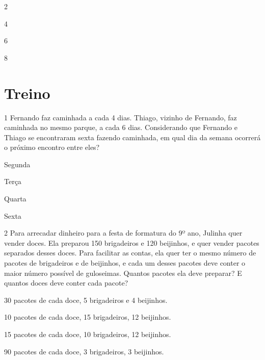 \begin{escolha}
\begin{minipage}{.5\textwidth}
\begin{escolha}
\item 2
\item 4
\item 6
\item 8
\end{escolha}
\end{minipage}

\section{Treino}

\num{1} Fernando faz caminhada a cada 4 dias. Thiago, vizinho de
Fernando, faz caminhada no mesmo parque, a cada 6 dias. Considerando que
Fernando e Thiago se encontraram sexta fazendo caminhada, em qual dia da
semana ocorrerá o próximo encontro entre eles?

\begin{escolha}
\item Segunda
\item Terça
\item Quarta
\item Sexta
\end{escolha}

\num{2} Para arrecadar dinheiro para a festa de formatura do 9º ano,
Julinha quer vender doces. Ela preparou 150 brigadeiros e 120 beijinhos,
e quer vender pacotes separados desses doces. Para facilitar as contas,
ela quer ter o mesmo número de pacotes de brigadeiros e de beijinhos, e
cada um desses pacotes deve conter o maior número possível de guloseimas. 
Quantos pacotes ela deve preparar? E quantos doces deve conter cada 
pacote?   

\begin{escolha}
\item
  30 pacotes de cada doce, 5 brigadeiros e 4 beijinhos.
\item
  10 pacotes de cada doce, 15 brigadeiros, 12 beijinhos.
\item
  15 pacotes de cada doce, 10 brigadeiros, 12 beijinhos.
\item
  90 pacotes de cada doce, 3 brigadeiros, 3 beijinhos.
\end{escolha}


\end{escolha}
